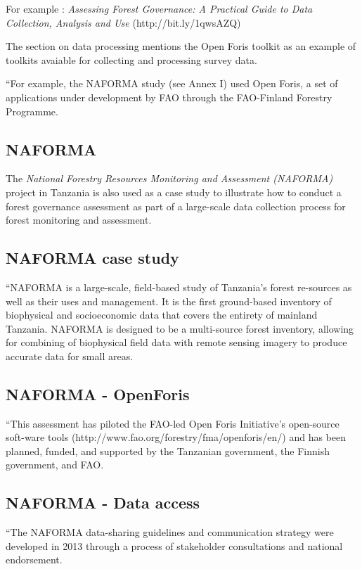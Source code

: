 \documentclass{article}
\begin{document}
For example : 
\textit{Assessing Forest Governance: A Practical Guide to Data Collection,
Analysis and Use} (http://bit.ly/1qwsAZQ)

The section on data processing mentions the Open Foris toolkit as an example of
toolkits avaiable for collecting and processing survey data.

``For example, the NAFORMA study (see Annex I) used Open Foris, a set of
applications under development by FAO through the FAO-Finland Forestry
Programme.

\subsection{NAFORMA}
 
The \textit{National Forestry Resources Monitoring and Assessment (NAFORMA)}
project in Tanzania is also used as a case study to illustrate how to conduct a
forest governance assessment as part of a large-scale data collection process
for forest monitoring and assessment.

\subsection{NAFORMA case study}
``NAFORMA is a large-scale, field-based study of Tanzania’s forest re-sources as
well as their uses and management. It is the first ground-based inventory of
biophysical and socioeconomic data that covers the entirety of mainland
Tanzania. NAFORMA is designed to be a multi-source forest inventory, allowing
for combining of biophysical field data with remote sensing imagery to produce
accurate data for small areas.

\subsection{NAFORMA - OpenForis}
``This assessment has piloted the FAO-led Open Foris Initiative’s open-source
soft-ware tools (http://www.fao.org/forestry/fma/openforis/en/) and has been
planned, funded, and supported by the Tanzanian government, the Finnish
government, and FAO.

\subsection{NAFORMA - Data access}
``The NAFORMA data-sharing guidelines and communication strategy were developed
in 2013 through a process of stakeholder consultations and national endorsement.
\end{document}
